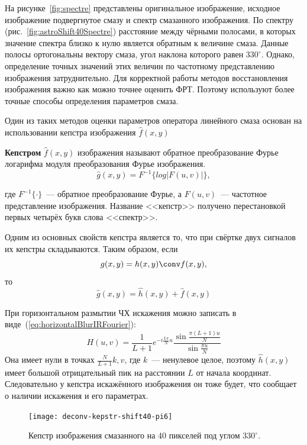 На рисунке~\ref{fig:spectre} представлены оригинальное изображение, исходное изображение подвергнутое смазу и спектр смазанного изображения. По спектру (рис.~\ref{fig:astroShift40Spectre}) расстояние между чёрными полосами, в которых значение спектра близко к нулю является обратным к величине смаза. Данные полосы ортогональны вектору смаза, угол наклона которого равен $330^\circ$. Однако, определение точных значений этих величин по частотному представлению изображения затруднительно. Для корректной работы методов восстановления изображения важно как можно точнее оценить ФРТ. Поэтому используют более точные способы определения параметров смаза.

Один из таких методов оценки параметров оператора линейного смаза основан на использовании кепстра изображения $\hat{f}(x,y)$~\cite{iterableImageRestorationBiemonLangdeik}
\begin{definition}\label{def:kepstr}
	\textbf{Кепстром} $\hat{f}(x,y)$ изображения называют обратное преобразование Фурье логарифма модуля преобразования Фурье изображения.
	\begin{equation}
	\hat{g}(x,y) = F^{-1}\{log|F(u,v)|\},
	\end{equation}
\end{definition}
где $F^{-1}\{\cdot\}$~--- обратное преобразование Фурье, а $F(u,v)$~--- частотное представление изображения. Название <<кепстр>> получено перестановкой первых четырёх букв слова <<спектр>>.

Одним из основных свойств кепстра является то, что при свёртке двух сигналов их кепстры складываются. Таким образом, если
\begin{equation}
	g(x,y) = h(x,y) \conv f(x,y),
\end{equation}
то \cite{iterableImageRestorationBiemonLangdeik}
\begin{equation}\label{eq:kepstrSum}
	\hat{g}(x,y) = \hat{h}(x,y) + \hat{f}(x,y)
\end{equation}

При горизонтальном размытии ЧХ искажения можно записать в виде~(\ref{eq:horizontalBlurIRFourier}):
\begin{equation*}
H(u,v) =       
\frac{1}{L+1}e^{-i\frac{L\pi}{N}u}\frac{\sin\frac{\pi(L+1)u}{N}}{\sin\frac{\pi u}{N}}
\end{equation*}
Она имеет нули в точках $\frac{N}{L+1}k, v$, где $k$~--- ненулевое целое, поэтому $\hat{h}(x,y)$ имеет большой отрицательный пик на расстоянии $L$ от начала координат. Следовательно у кепстра искажённого изображения он тоже будет, что сообщает о наличии искажения и его параметрах.
\begin{figure}[h!]
	\centerline{\texttt{[image: deconv-kepstr-shift40-pi6]}}
	\caption{Кепстр изображения смазанного на 40 пикселей под углом $330^{\circ}$.}
	\label{fig:kepstr}
\end{figure}

